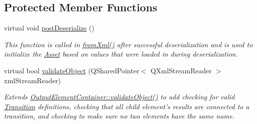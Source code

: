 \subsection*{Protected Member Functions}
\begin{DoxyCompactItemize}
\item 
virtual void \hyperlink{class_picto_1_1_machine_container_a36591811c50d2086866100c246d751d0}{post\-Deserialize} ()
\begin{DoxyCompactList}\small\item\em This function is called in \hyperlink{class_picto_1_1_asset_a8bed4da09ecb1c07ce0dab313a9aba67}{from\-Xml()} after successful deserialization and is used to initialize the \hyperlink{class_picto_1_1_asset}{Asset} based on values that were loaded in during deserialization. \end{DoxyCompactList}\item 
\hypertarget{class_picto_1_1_machine_container_a53ea9684c79a21ff959dfaf3a3bc73ae}{virtual bool \hyperlink{class_picto_1_1_machine_container_a53ea9684c79a21ff959dfaf3a3bc73ae}{validate\-Object} (Q\-Shared\-Pointer$<$ Q\-Xml\-Stream\-Reader $>$ xml\-Stream\-Reader)}\label{class_picto_1_1_machine_container_a53ea9684c79a21ff959dfaf3a3bc73ae}

\begin{DoxyCompactList}\small\item\em Extends \hyperlink{class_picto_1_1_output_element_container_a19905a70272fa330d195ed51bfca1a16}{Output\-Element\-Container\-::validate\-Object()} to add checking for valid \hyperlink{class_picto_1_1_transition}{Transition} definitions, checking that all child element's results are connected to a transition, and checking to make sure no two elements have the same name. \end{DoxyCompactList}\end{DoxyCompactItemize}
